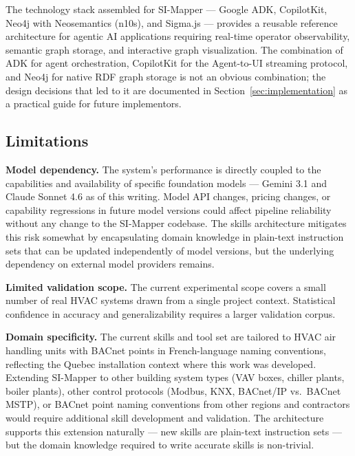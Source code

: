 The technology stack assembled for SI-Mapper --- Google ADK, CopilotKit, Neo4j with Neosemantics
(n10s), and Sigma.js --- provides a reusable reference architecture for agentic AI applications
requiring real-time operator observability, semantic graph storage, and interactive graph
visualization.
The combination of ADK for agent orchestration, CopilotKit for the Agent-to-UI streaming protocol,
and Neo4j for native RDF graph storage is not an obvious combination; the design decisions that
led to it are documented in Section~\ref{sec:implementation} as a practical guide for future
implementors.

\subsection{Limitations}
\label{subsec:limitations}

\textbf{Model dependency.}
The system's performance is directly coupled to the capabilities and availability of specific
foundation models --- Gemini 3.1 and Claude Sonnet 4.6 as of this writing.
Model API changes, pricing changes, or capability regressions in future model versions could
affect pipeline reliability without any change to the SI-Mapper codebase.
The skills architecture mitigates this risk somewhat by encapsulating domain knowledge in
plain-text instruction sets that can be updated independently of model versions, but the
underlying dependency on external model providers remains.

\textbf{Limited validation scope.}
The current experimental scope covers a small number of real HVAC systems drawn from a single
project context.
Statistical confidence in accuracy and generalizability requires a larger validation corpus.

\textbf{Domain specificity.}
The current skills and tool set are tailored to HVAC air handling units with BACnet points
in French-language naming conventions, reflecting the Quebec installation context where this
work was developed.
Extending SI-Mapper to other building system types (VAV boxes, chiller plants, boiler plants),
other control protocols (Modbus, KNX, BACnet/IP vs.\ BACnet MSTP), or BACnet point naming
conventions from other regions and contractors would require additional skill development and
validation.
The architecture supports this extension naturally --- new skills are plain-text instruction
sets --- but the domain knowledge required to write accurate skills is non-trivial.

